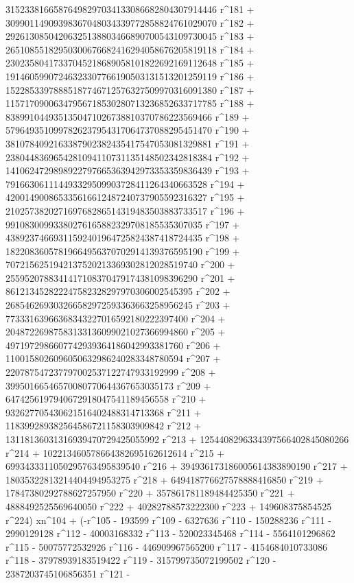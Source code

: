        31523381665876498297034133086682804307914446 r^181 + 
       30990114909398367048034339772858824761029070 r^182 + 
       29261308504206325138803466890700543109730045 r^183 + 
       26510855182950300676682416294058676205819118 r^184 + 
       23023580417337045218689058101822692169112648 r^185 + 
       19146059907246323307766190503131513201259119 r^186 + 
       15228533978885187746712576327509970316091380 r^187 + 
       11571709006347956718530280713236852633717785 r^188 + 
       8389910449351350471026738810370786223569466 r^189 + 
       5796493510997826237954317064737088295451470 r^190 + 
       3810784092163387902382435417547053081329881 r^191 + 
       2380448369654281094110731135148502342818384 r^192 + 
       1410624729898922797665363942973353359836439 r^193 + 
       791663061114493329509903728411264340663528 r^194 + 
       420014900865335616612487240737905592316327 r^195 + 
       210257382027169768286514319483503883733517 r^196 + 
       99108300993380276165882329708185535307035 r^197 + 
       43892374669311592401964725824387418724435 r^198 + 
       18220836057819664956370702914139376595190 r^199 + 
       7072156251942137520213369302812028519740 r^200 + 
       2559520788341417108370479174381098396290 r^201 + 
       861213452822247582328297970306002545395 r^202 + 
       268546269303266582972593363663258956245 r^203 + 
       77333163966368343227016592180222397400 r^204 + 
       20487226987583133136099021027366994860 r^205 + 
       4971972986607742939364186042993381760 r^206 + 
       1100158026096050632986240283348780594 r^207 + 
       220787547237797002537122747933192999 r^208 + 
       39950166546570080770644367653035173 r^209 + 
       6474256197940672918047541189456558 r^210 + 
       932627705430621516402488314713368 r^211 + 
       118399289382564586721158303909842 r^212 + 
       13118136031316939470729425055992 r^213 + 
       1254408296334397566402845080266 r^214 + 
       102213460578664382695162612614 r^215 + 
       6993433311050295763495839540 r^216 + 
       394936173186005614383890190 r^217 + 
       18035322813214404494953275 r^218 + 
       649418776627578888416850 r^219 + 
       17847380292788627257950 r^220 + 357861781189484425350 r^221 + 
       4888492525569640050 r^222 + 40282788573222300 r^223 + 
       149608375854525 r^224) xn^104 + (-r^105 - 193599 r^109 - 
       6327636 r^110 - 150288236 r^111 - 2990129128 r^112 - 
       40003168332 r^113 - 520023345468 r^114 - 5564101296862 r^115 - 
       50075772532926 r^116 - 446909967565200 r^117 - 
       4154684010733086 r^118 - 37978939183519422 r^119 - 
       315799735072199502 r^120 - 2387203745106856351 r^121 - 
